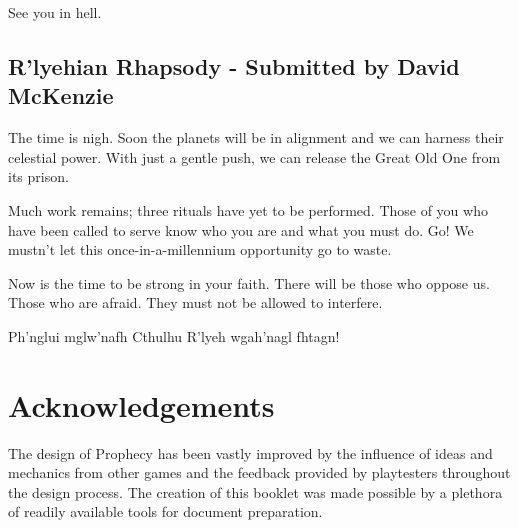 \documentclass[12pt, a5paper, parskip=half-]{scrartcl}
\begin{document}
See you in hell.

\subsection*{R'lyehian Rhapsody \setmainfont{URWClassico} - Submitted by David McKenzie} \label{subsection:rlyehian-rhapsody}
The time is nigh.
Soon the planets will be in alignment and we can harness their celestial power.
With just a gentle push, we can release the Great Old One from its prison.

Much work remains; three rituals have yet to be performed.
Those of you who have been called to serve know who you are and what you must do.  Go! We mustn't let this once-in-a-millennium opportunity go to waste.

Now is the time to be strong in your faith.
There will be those who oppose us.
Those who are afraid.
They must not be allowed to interfere.

Ph'nglui mglw'nafh Cthulhu R'lyeh wgah'nagl fhtagn!

\newpage

\thispagestyle{titleheader}
\enlargethispage{3.5\baselineskip} %

\section*{Acknowledgements} \label{section:acknowledgements}
The design of Prophecy has been vastly improved by the influence of ideas and mechanics from other games and the feedback provided by playtesters throughout the design process.  
The creation of this booklet was made possible by a plethora of readily available tools for document preparation.
\end{document}
